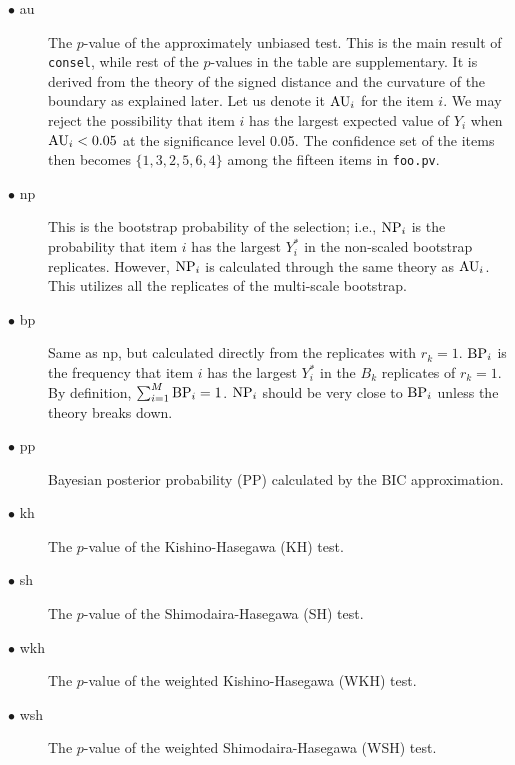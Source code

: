 \documentclass[12pt]{article}
\begin{document}
\begin{description}
 \item[$\bullet$ au] The $p$-value of the approximately unbiased
	    test. This is the main result of {\tt consel}, while rest of
	    the $p$-values in the table are supplementary.  It is
	    derived from the theory of the signed distance and the
	    curvature of the boundary as explained later.  Let us denote
	    it ${\rm AU}_i$ for the item $i$. We may reject the
	    possibility that item $i$ has the largest expected value of
	    $Y_i$ when ${\rm AU}_i < 0.05$ at the significance level
	    0.05. The confidence set of the items then becomes $\{1,3,2,
	    5,6,4 \}$ among the fifteen items in {\tt foo.pv}.
 \item[$\bullet$ np] This is the bootstrap probability of the selection;
	    i.e., ${\rm NP}_i$ is the probability that item $i$ has the
	    largest $Y^*_i$ in the non-scaled bootstrap replicates.
	    However, ${\rm NP}_i$ is calculated through the same theory
	    as ${\rm AU}_i$.  This utilizes all the replicates of the
	    multi-scale bootstrap.
 \item[$\bullet$ bp] Same as np, but calculated directly from the
	    replicates with $r_k=1$. ${\rm BP}_i$ is the frequency
	    that item $i$ has the largest $Y^*_i$ in the $B_k$
	    replicates of $r_k=1$. By definition, $\sum_{i=1}^M
	    {\rm BP}_i = 1$. ${\rm NP}_i $ should be very close to
	    ${\rm BP}_i$ unless the theory breaks down.
 \item[$\bullet$ pp] Bayesian posterior probability (PP) calculated by
	    the BIC approximation.
 \item[$\bullet$ kh] The $p$-value of the Kishino-Hasegawa (KH) test.
 \item[$\bullet$ sh] The $p$-value of the Shimodaira-Hasegawa (SH) test.
 \item[$\bullet$ wkh] The $p$-value of the weighted Kishino-Hasegawa
	    (WKH) test.
 \item[$\bullet$ wsh] The $p$-value of the weighted Shimodaira-Hasegawa
	    (WSH) test.
\end{description}
\end{document}
